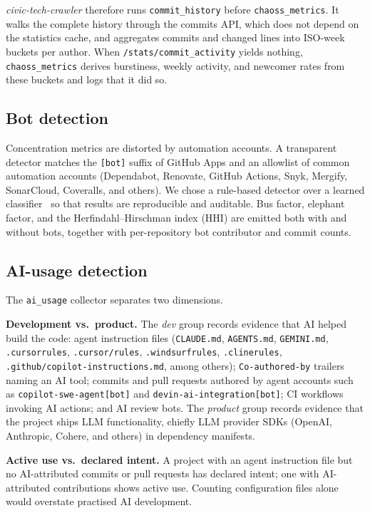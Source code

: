 \documentclass[10pt,conference]{IEEEtran}
\newcommand{\tool}{\textit{civic-tech-crawler}}
\begin{document}
\tool{} therefore runs \texttt{commit\_history} before \texttt{chaoss\_metrics}. It walks the complete history through the commits API, which does not depend on the statistics cache, and aggregates commits and changed lines into ISO-week buckets per author. When \texttt{/stats/commit\_activity} yields nothing, \texttt{chaoss\_metrics} derives burstiness, weekly activity, and newcomer rates from these buckets and logs that it did so.

\subsection{Bot detection}

Concentration metrics are distorted by automation accounts. A transparent detector matches the \texttt{[bot]} suffix of GitHub Apps and an allowlist of common automation accounts (Dependabot, Renovate, GitHub Actions, Snyk, Mergify, SonarCloud, Coveralls, and others). We chose a rule-based detector over a learned classifier~\cite{golzadeh-bots} so that results are reproducible and auditable. Bus factor, elephant factor, and the Herfindahl--Hirschman index (HHI) are emitted both with and without bots, together with per-repository bot contributor and commit counts.

\subsection{AI-usage detection}
\label{sec:ai}

The \texttt{ai\_usage} collector separates two dimensions.

\textbf{Development vs.\ product.} The \emph{dev} group records evidence that AI helped build the code: agent instruction files (\texttt{CLAUDE.md}, \texttt{AGENTS.md}, \texttt{GEMINI.md}, \texttt{.cursorrules}, \texttt{.cursor/rules}, \texttt{.windsurfrules}, \texttt{.clinerules}, \texttt{.github/copilot-instructions.md}, among others); \texttt{Co-authored-by} trailers naming an AI tool; commits and pull requests authored by agent accounts such as \texttt{copilot-swe-agent[bot]} and \texttt{devin-ai-integration[bot]}; CI workflows invoking AI actions; and AI review bots. The \emph{product} group records evidence that the project ships LLM functionality, chiefly LLM provider SDKs (OpenAI, Anthropic, Cohere, and others) in dependency manifests.

\textbf{Active use vs.\ declared intent.} A project with an agent instruction file but no AI-attributed commits or pull requests has declared intent; one with AI-attributed contributions shows active use. Counting configuration files alone would overstate practised AI development.
\end{document}
